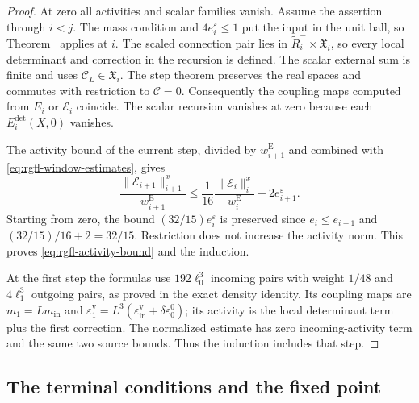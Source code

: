 \begin{proof}
At zero all activities and scalar families vanish.
Assume the assertion through $i<j$.
The mass condition and
$4e_i^\varepsilon\le1$ put the input in the unit ball,
so Theorem~ applies at $i$.
The scaled connection pair lies in
$\widetilde R_i^-\times\mathfrak X_i$, so every local
determinant and correction in the recursion is defined.
The scalar external sum is finite and uses
$\mathscr C_L\in\mathfrak X_i$.
The step theorem preserves the real spaces
and commutes with restriction to $\mathscr C=0$.
Consequently the coupling maps computed from
$E_i$ or $\mathscr E_i$ coincide.
The scalar recursion vanishes at zero because each
$E_i^{\mathrm{det}}(X,0)$ vanishes.

The activity bound of the current step, divided by
$w_{i+1}^{\mathrm E}$ and combined with
\eqref{eq:rgfl-window-estimates}, gives
\[
 \frac{\|\mathscr E_{i+1}\|_{i+1}^x}{w_{i+1}^{\mathrm E}}
      \le\frac1{16}
                   \frac{\|\mathscr E_i\|_i^x}{w_i^{\mathrm E}}
                                     +2e_{i+1}^\varepsilon.
\]
Starting from zero, the bound
$(32/15)e_i^\varepsilon$ is preserved since
$e_i\le e_{i+1}$ and $(32/15)/16+2=32/15$.
Restriction does not increase the activity norm.
This proves \eqref{eq:rgfl-activity-bound} and the induction.

At the first step the formulas use $192\ell_0^3$
incoming pairs with weight $1/48$ and
$4\ell_1^3$ outgoing pairs, as proved in the
exact density identity.
Its coupling maps are
$m_1=Lm_{\mathrm{in}}$ and
$\varepsilon_1^{\mathrm v}
 =L^3(\varepsilon_{\mathrm{in}}^{\mathrm v}+\delta\varepsilon_0^0)$;
its activity is the local determinant term plus
the first correction. The normalized estimate has
zero incoming-activity term and the same two
source bounds. Thus the induction includes that step.
\end{proof}

\subsection{The terminal conditions and the fixed point}
\label{subsec:rgfl-fixed-point}

